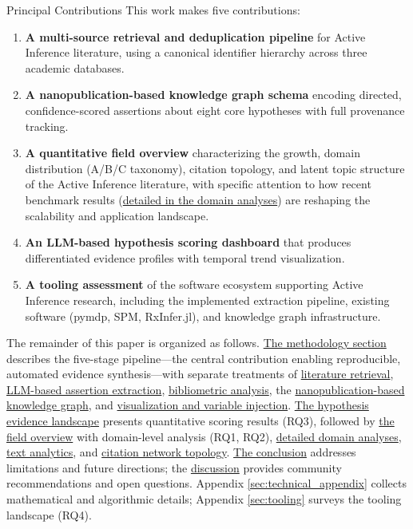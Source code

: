 \documentclass[
  ignorenonframetext,
]{beamer}
\begin{document}
\begin{frame}{Principal Contributions}
\protect{}\label{principal-contributions}
This work makes five contributions:

\begin{enumerate}
\item
  \textbf{A multi-source retrieval and deduplication pipeline} for
  Active Inference literature, using a canonical identifier hierarchy
  across three academic databases.
\item
  \textbf{A nanopublication-based knowledge graph schema} encoding
  directed, confidence-scored assertions about eight core hypotheses
  with full provenance tracking.
\item
  \textbf{A quantitative field overview} characterizing the growth,
  domain distribution (A/B/C taxonomy), citation topology, and latent
  topic structure of the Active Inference literature, with specific
  attention to how recent benchmark results
  (\hyperref[sec:subfield_analyses]{detailed in the domain analyses})
  are reshaping the scalability and application landscape.
\item
  \textbf{An LLM-based hypothesis scoring dashboard} that produces
  differentiated evidence profiles with temporal trend visualization.
\item
  \textbf{A tooling assessment} of the software ecosystem supporting
  Active Inference research, including the implemented extraction
  pipeline, existing software (pymdp, SPM, RxInfer.jl), and knowledge
  graph infrastructure.
\end{enumerate}

The remainder of this paper is organized as follows.
\hyperref[sec:methods]{The methodology section} describes the five-stage
pipeline---the central contribution enabling reproducible, automated
evidence synthesis---with separate treatments of
\hyperref[sec:methods_retrieval]{literature retrieval},
\hyperref[sec:extraction_pipeline]{LLM-based assertion extraction},
\hyperref[sec:methods_bibliometrics]{bibliometric analysis}, the
\hyperref[sec:methods_kg]{nanopublication-based knowledge graph}, and
\hyperref[sec:methods_viz]{visualization and variable injection}.
\hyperref[sec:hypothesis_results]{The hypothesis evidence landscape}
presents quantitative scoring results (RQ3), followed by
\hyperref[sec:field_overview]{the field overview} with domain-level
analysis (RQ1, RQ2),
\hyperref[sec:subfield_analyses]{detailed domain analyses},
\hyperref[sec:text_analytics]{text analytics}, and
\hyperref[sec:citation_network]{citation network topology}.
\hyperref[sec:conclusion]{The conclusion} addresses limitations and
future directions; the \hyperref[sec:discussion]{discussion} provides
community recommendations and open questions. Appendix
\ref{sec:technical_appendix} collects mathematical and algorithmic
details; Appendix \ref{sec:tooling} surveys the tooling landscape (RQ4).
\end{frame}
\end{document}

